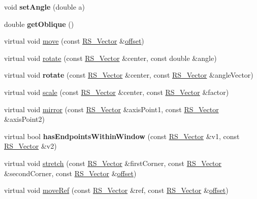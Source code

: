 \begin{DoxyCompactItemize}
\item 
\hypertarget{classRS__DimLinear_a8938e4de5b9789f3799c9ab1c86786a4}{void {\bfseries set\-Angle} (double a)}\label{classRS__DimLinear_a8938e4de5b9789f3799c9ab1c86786a4}

\item 
\hypertarget{classRS__DimLinear_a16b1618ebe4cfee34a56b5670929a11b}{double {\bfseries get\-Oblique} ()}\label{classRS__DimLinear_a16b1618ebe4cfee34a56b5670929a11b}

\item 
virtual void \hyperlink{classRS__DimLinear_a7c70b1dbdcbe28767827543ea18cc8a0}{move} (const \hyperlink{classRS__Vector}{R\-S\-\_\-\-Vector} \&\hyperlink{classRS__Entity_aa296d21b9aac99161d386ce2f60f0fea}{offset})
\item 
virtual void \hyperlink{classRS__DimLinear_ab719fea1fbc67f2f4e3b71bef9863ffb}{rotate} (const \hyperlink{classRS__Vector}{R\-S\-\_\-\-Vector} \&center, const double \&angle)
\item 
\hypertarget{classRS__DimLinear_a8173c2f16e5971ba8987072906fbdfd3}{virtual void {\bfseries rotate} (const \hyperlink{classRS__Vector}{R\-S\-\_\-\-Vector} \&center, const \hyperlink{classRS__Vector}{R\-S\-\_\-\-Vector} \&angle\-Vector)}\label{classRS__DimLinear_a8173c2f16e5971ba8987072906fbdfd3}

\item 
virtual void \hyperlink{classRS__DimLinear_ad6e2aeee23b4d9b3056fc868b466c044}{scale} (const \hyperlink{classRS__Vector}{R\-S\-\_\-\-Vector} \&center, const \hyperlink{classRS__Vector}{R\-S\-\_\-\-Vector} \&factor)
\item 
virtual void \hyperlink{classRS__DimLinear_a70f0514a6a5b0cded617b345b706a5a9}{mirror} (const \hyperlink{classRS__Vector}{R\-S\-\_\-\-Vector} \&axis\-Point1, const \hyperlink{classRS__Vector}{R\-S\-\_\-\-Vector} \&axis\-Point2)
\item 
\hypertarget{classRS__DimLinear_a7854bdcedaec83a23495578d58abac4c}{virtual bool {\bfseries has\-Endpoints\-Within\-Window} (const \hyperlink{classRS__Vector}{R\-S\-\_\-\-Vector} \&v1, const \hyperlink{classRS__Vector}{R\-S\-\_\-\-Vector} \&v2)}\label{classRS__DimLinear_a7854bdcedaec83a23495578d58abac4c}

\item 
virtual void \hyperlink{classRS__DimLinear_a8a91143d9f0c7d71b3bc3a408b2a373f}{stretch} (const \hyperlink{classRS__Vector}{R\-S\-\_\-\-Vector} \&first\-Corner, const \hyperlink{classRS__Vector}{R\-S\-\_\-\-Vector} \&second\-Corner, const \hyperlink{classRS__Vector}{R\-S\-\_\-\-Vector} \&\hyperlink{classRS__Entity_aa296d21b9aac99161d386ce2f60f0fea}{offset})
\item 
virtual void \hyperlink{classRS__DimLinear_a8d09e095655cab24c83f20d3685d9e9b}{move\-Ref} (const \hyperlink{classRS__Vector}{R\-S\-\_\-\-Vector} \&ref, const \hyperlink{classRS__Vector}{R\-S\-\_\-\-Vector} \&\hyperlink{classRS__Entity_aa296d21b9aac99161d386ce2f60f0fea}{offset})
\end{DoxyCompactItemize}
